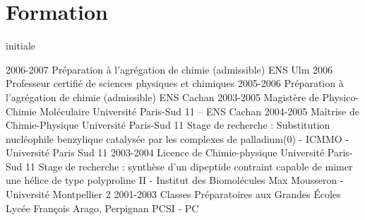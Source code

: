\documentclass{../cv-style}     %
\begin{document}
\vspace{-2ex}
\section{Formation}{ initiale}
\vspace{-1ex}

\begin{entrylist}
\entry
{2006-2007}
{Préparation à l'agrégation de chimie (admissible)}
{ENS Ulm}
{\vspace{-3mm}}
\entry
{2006}
{Professeur certifié de sciences physiques et chimiques}
{}
{\vspace{-3mm}}
\entry
{2005-2006}
{Préparation à l'agrégation de chimie (admissible)}
{ENS Cachan}
{\vspace{-3mm}}
\entry
{2003-2005}
{Magistère de Physico-Chimie Moléculaire}
{Université Paris-Sud 11 -- ENS Cachan}
{\vspace{-3mm}}
\entry
{2004-2005}
{Maîtrise de Chimie-Physique}
{Université Paris-Sud 11}
{\small Stage de recherche : Substitution nucléophile benzylique                      
catalysée par les complexes de palladium(0) - ICMMO - Université Paris Sud 11}
\entry
{2003-2004}
{Licence de Chimie-physique}
{Université Paris-Sud 11}
{\small Stage de recherche : synthèse d'un dipeptide contraint capable de mimer une hélice de type polyproline II - 
Institut des Biomolécules Max Mousseron - Université Montpellier 2}
\entry
{2001-2003}
{Classes Préparatoires aux Grandes Écoles}
{Lycée François Arago, Perpignan}
{PCSI - PC}
\end{entrylist}

%
\end{document}
